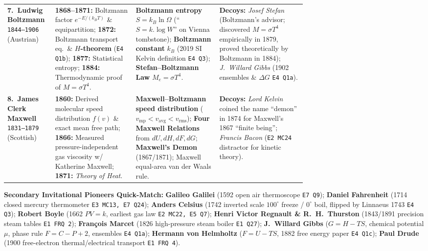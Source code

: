 {\begin{tabularx}{\linewidth}{@{}L{0.16\linewidth} L{0.27\linewidth} L{0.28\linewidth} X@{}}
\textbf{7.\ Ludwig Boltzmann} \newline \texttt{1844--1906} (Austrian) & \textbf{1868--1871:} Boltzmann factor $e^{-E/(k_B T)}$ \& equipartition; \textbf{1872:} Boltzmann transport eq.\ \& \textbf{$H$-theorem} (\texttt{E4 Q1b}); \textbf{1877:} Statistical entropy; \textbf{1884:} Thermodynamic proof of $M = \sigma T^4$. & \textbf{Boltzmann entropy} $S = k_B\ln\Omega$ (``$S = k.\log W$'' on Vienna tombstone); \textbf{Boltzmann constant} $k_B$ (2019 SI Kelvin definition \texttt{E4 Q3}); \textbf{Stefan--Boltzmann Law} $M_e = \sigma T^4$. & \textbf{Decoys:} \textit{Josef Stefan} (Boltzmann's advisor; discovered $M = \sigma T^4$ empirically in 1879, proved theoretically by Boltzmann in 1884); \textit{J.\ Willard Gibbs} (1902 ensembles \& $\Delta G$ \texttt{E4 Q1a}). \\
\textbf{8.\ James Clerk Maxwell} \newline \texttt{1831--1879} (Scottish) & \textbf{1860:} Derived molecular speed distribution $f(v)$ \& exact mean free path; \textbf{1866:} Measured pressure-independent gas viscosity w/ Katherine Maxwell; \textbf{1871:} \textit{Theory of Heat}. & \textbf{Maxwell--Boltzmann speed distribution} ($v_{\mathrm{mp}} < v_{\mathrm{avg}} < v_{\mathrm{rms}}$); \textbf{Four Maxwell Relations} from $dU, dH, dF, dG$; \textbf{Maxwell's Demon} (1867/1871); Maxwell equal-area van der Waals rule. & \textbf{Decoys:} \textit{Lord Kelvin} coined the name ``demon'' in 1874 for Maxwell's 1867 ``finite being''; \textit{Francis Bacon} (\texttt{E2 MC24} distractor for kinetic theory). \\
\bottomrule
\end{tabularx}
\par}\smallskip

\noindent\textbf{Secondary Invitational Pioneers Quick-Match:} \textbf{Galileo Galilei} (1592 open air thermoscope \texttt{E7 Q9}); \textbf{Daniel Fahrenheit} (1714 closed mercury thermometer \texttt{E3 MC13, E7 Q24}); \textbf{Anders Celsius} (1742 inverted scale $100^\circ$ freeze / $0^\circ$ boil, flipped by Linnaeus 1743 \texttt{E4 Q3}); \textbf{Robert Boyle} (1662 $PV=k$, earliest gas law \texttt{E2 MC22, E5 Q7}); \textbf{Henri Victor Regnault \& R.\ H.\ Thurston} (1843/1891 precision steam tables \texttt{E1 FRQ 2}); \textbf{Fran\c{c}ois Marcet} (1826 high-pressure steam boiler \texttt{E1 Q27}); \textbf{J.\ Willard Gibbs} ($G = H - TS$, chemical potential $\mu$, phase rule $F = C - P + 2$, ensembles \texttt{E4 Q1a}); \textbf{Hermann von Helmholtz} ($F = U - TS$, 1882 free energy paper \texttt{E4 Q1c}); \textbf{Paul Drude} (1900 free-electron thermal/electrical transport \texttt{E1 FRQ 4}).


